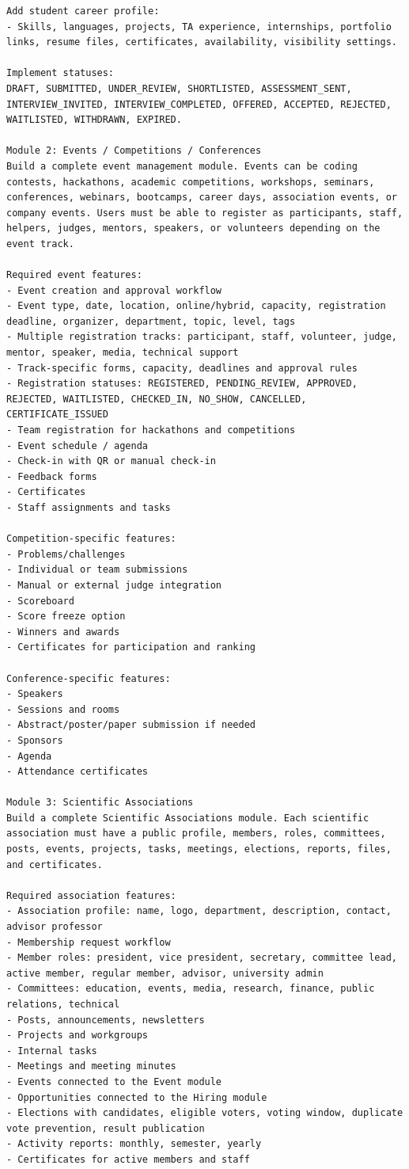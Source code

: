 \documentclass[12pt,a4paper]{article}
\begin{document}
\begin{LTR}
\begin{lstlisting}
Add student career profile:
- Skills, languages, projects, TA experience, internships, portfolio links, resume files, certificates, availability, visibility settings.

Implement statuses:
DRAFT, SUBMITTED, UNDER_REVIEW, SHORTLISTED, ASSESSMENT_SENT, INTERVIEW_INVITED, INTERVIEW_COMPLETED, OFFERED, ACCEPTED, REJECTED, WAITLISTED, WITHDRAWN, EXPIRED.

Module 2: Events / Competitions / Conferences
Build a complete event management module. Events can be coding contests, hackathons, academic competitions, workshops, seminars, conferences, webinars, bootcamps, career days, association events, or company events. Users must be able to register as participants, staff, helpers, judges, mentors, speakers, or volunteers depending on the event track.

Required event features:
- Event creation and approval workflow
- Event type, date, location, online/hybrid, capacity, registration deadline, organizer, department, topic, level, tags
- Multiple registration tracks: participant, staff, volunteer, judge, mentor, speaker, media, technical support
- Track-specific forms, capacity, deadlines and approval rules
- Registration statuses: REGISTERED, PENDING_REVIEW, APPROVED, REJECTED, WAITLISTED, CHECKED_IN, NO_SHOW, CANCELLED, CERTIFICATE_ISSUED
- Team registration for hackathons and competitions
- Event schedule / agenda
- Check-in with QR or manual check-in
- Feedback forms
- Certificates
- Staff assignments and tasks

Competition-specific features:
- Problems/challenges
- Individual or team submissions
- Manual or external judge integration
- Scoreboard
- Score freeze option
- Winners and awards
- Certificates for participation and ranking

Conference-specific features:
- Speakers
- Sessions and rooms
- Abstract/poster/paper submission if needed
- Sponsors
- Agenda
- Attendance certificates

Module 3: Scientific Associations
Build a complete Scientific Associations module. Each scientific association must have a public profile, members, roles, committees, posts, events, projects, tasks, meetings, elections, reports, files, and certificates.

Required association features:
- Association profile: name, logo, department, description, contact, advisor professor
- Membership request workflow
- Member roles: president, vice president, secretary, committee lead, active member, regular member, advisor, university admin
- Committees: education, events, media, research, finance, public relations, technical
- Posts, announcements, newsletters
- Projects and workgroups
- Internal tasks
- Meetings and meeting minutes
- Events connected to the Event module
- Opportunities connected to the Hiring module
- Elections with candidates, eligible voters, voting window, duplicate vote prevention, result publication
- Activity reports: monthly, semester, yearly
- Certificates for active members and staff


\end{lstlisting}
\end{LTR}
\end{document}
